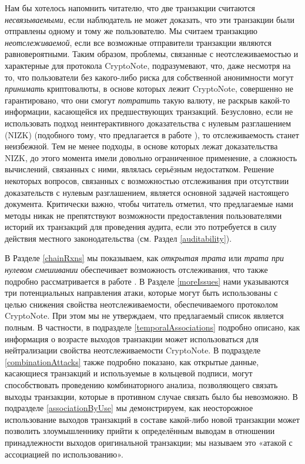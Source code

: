 \documentclass{mrl}
\begin{document}
Нам бы хотелось напомнить читателю, что две транзакции считаются \textit{несвязываемыми}, если наблюдатель не может доказать, что эти транзакции были отправлены одному и тому же пользователю. Мы считаем транзакцию \textit{неотслеживаемой}, если все возможные отправители транзакции являются равновероятными. Таким образом, проблемы, связанные с неотслеживаемостью и характерные для протокола CryptoNote, подразумевают, что, даже несмотря на то, что пользователи без какого-либо риска для собственной анонимности могут \textit{принимать} криптовалюты, в основе которых лежит CryptoNote, совершенно не гарантировано, что они смогут \textit{потратить} такую валюту, не раскрыв какой-то информации, касающейся их предшествующих транзакций. Безусловно, если не использовать подход неинтерактивного доказательства с нулевым разглашением (NIZK) (подобного тому, что предлагается в работе \cite{miers2013zerocoin}), то отслеживаемость станет неизбежной. Тем не менее подходы, в основе которых лежат доказательства NIZK, до этого момента имели довольно ограниченное применение, а сложность вычислений, связанных с ними, являлась серьёзным недостатком. Решение некоторых вопросов, связанных с возможностью отслеживания при отсутствии доказательств с нулевым разглашением, является основной задачей настоящего документа. Критически важно, чтобы читатель отметил, что предлагаемые нами методы никак не препятствуют возможности предоставления пользователями историй их транзакций для проведения аудита, если это потребуется в силу действия местного законодательства (см. Раздел \ref{auditability}).

В Разделе \ref{chainRxns} мы показываем, как \textit{открытая трата} или \textit{трата при нулевом смешивании} обеспечивает возможность отслеживания, что также подробно рассматривается в работе \cite{chainReactions}. В Разделе \ref{moreIssues} нами указываются три потенциальных направления атаки, которые могут быть использованы с целью снижения свойства неотслеживаемости, обеспечиваемого протоколом CryptoNote. При этом мы не утверждаем, что предлагаемый список является полным. В частности, в подразделе \ref{temporalAssociations} подробно описано, как информация о возрасте выходов транзакции может использоваться для нейтрализации свойства неотслеживаемости CryptoNote. В подразделе \ref{combinationAttacks} также подробно показано, как открытые данные, касающиеся транзакций и используемые в кольцевой подписи, могут способствовать проведению комбинаторного анализа, позволяющего связать выходы транзакции, которые в противном случае связать было бы невозможно. В подразделе \ref{associationByUse} мы демонстрируем, как неосторожное использование выходов транзакций в составе какой-либо новой транзакции может позволить злоумышленнику прийти к определённым выводам в отношении принадлежности выходов оригинальной транзакции; мы называем это «атакой с ассоциацией по использованию».
\end{document}
